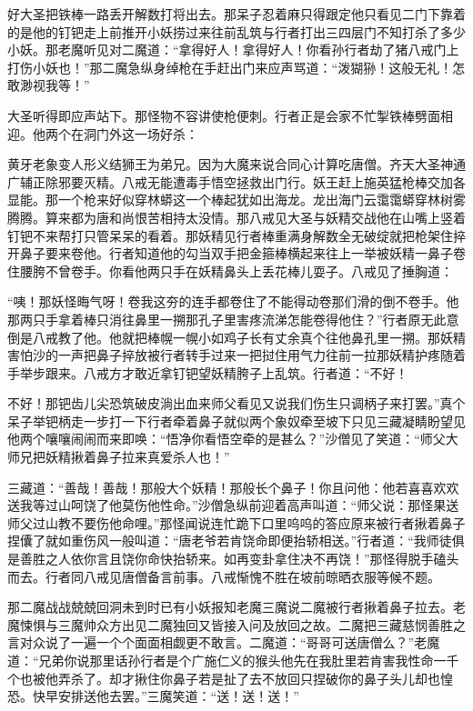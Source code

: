 \documentclass[12pt,UTF8]{ctexbook}
\begin{document}
{	好大圣把铁棒一路丢开解数打将出去。那呆子忍着麻只得跟定他只看见二门下靠着的是他的钉钯走上前推开小妖捞过来往前乱筑与行者打出三四层门不知打杀了多少小妖。那老魔听见对二魔道：“拿得好人！拿得好人！你看孙行者劫了猪八戒门上打伤小妖也！”那二魔急纵身绰枪在手赶出门来应声骂道：“泼猢狲！这般无礼！怎敢渺视我等！”
	
	大圣听得即应声站下。那怪物不容讲使枪便刺。行者正是会家不忙掣铁棒劈面相迎。他两个在洞门外这一场好杀：
	
	黄牙老象变人形义结狮王为弟兄。因为大魔来说合同心计算吃唐僧。齐天大圣神通广辅正除邪要灭精。八戒无能遭毒手悟空拯救出门行。妖王赶上施英猛枪棒交加各显能。那一个枪来好似穿林蟒这一个棒起犹如出海龙。龙出海门云霭霭蟒穿林树雾腾腾。算来都为唐和尚恨苦相持太没情。那八戒见大圣与妖精交战他在山嘴上竖着钉钯不来帮打只管呆呆的看着。那妖精见行者棒重满身解数全无破绽就把枪架住捽开鼻子要来卷他。行者知道他的勾当双手把金箍棒横起来往上一举被妖精一鼻子卷住腰胯不曾卷手。你看他两只手在妖精鼻头上丢花棒儿耍子。八戒见了捶胸道：
	
	“咦！那妖怪晦气呀！卷我这夯的连手都卷住了不能得动卷那们滑的倒不卷手。他那两只手拿着棒只消往鼻里一搠那孔子里害疼流涕怎能卷得他住？”行者原无此意倒是八戒教了他。他就把棒幌一幌小如鸡子长有丈余真个往他鼻孔里一搠。那妖精害怕沙的一声把鼻子捽放被行者转手过来一把挝住用气力往前一拉那妖精护疼随着手举步跟来。八戒方才敢近拿钉钯望妖精胯子上乱筑。行者道：“不好！
	
	不好！那钯齿儿尖恐筑破皮淌出血来师父看见又说我们伤生只调柄子来打罢。”真个呆子举钯柄走一步打一下行者牵着鼻子就似两个象奴牵至坡下只见三藏凝睛盼望见他两个嚷嚷闹闹而来即唤：“悟净你看悟空牵的是甚么？”沙僧见了笑道：“师父大师兄把妖精揪着鼻子拉来真爱杀人也！”
	
	三藏道：“善哉！善哉！那般大个妖精！那般长个鼻子！你且问他：他若喜喜欢欢送我等过山呵饶了他莫伤他性命。”沙僧急纵前迎着高声叫道：“师父说：那怪果送师父过山教不要伤他命哩。”那怪闻说连忙跪下口里呜呜的答应原来被行者揪着鼻子捏儾了就如重伤风一般叫道：“唐老爷若肯饶命即便抬轿相送。”行者道：“我师徒俱是善胜之人依你言且饶你命快抬轿来。如再变卦拿住决不再饶！”那怪得脱手磕头而去。行者同八戒见唐僧备言前事。八戒惭愧不胜在坡前晾晒衣服等候不题。
	
	那二魔战战兢兢回洞未到时已有小妖报知老魔三魔说二魔被行者揪着鼻子拉去。老魔悚惧与三魔帅众方出见二魔独回又皆接入问及放回之故。二魔把三藏慈悯善胜之言对众说了一遍一个个面面相觑更不敢言。二魔道：“哥哥可送唐僧么？”老魔道：“兄弟你说那里话孙行者是个广施仁义的猴头他先在我肚里若肯害我性命一千个也被他弄杀了。却才揪住你鼻子若是扯了去不放回只捏破你的鼻子头儿却也惶恐。快早安排送他去罢。”三魔笑道：“送！送！送！”
	
}
\end{document}
